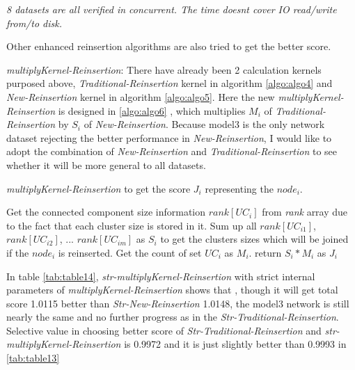 \documentclass{article}
\begin{document}
\begin{table}[!htbp]
\begin{adjustwidth}{-2cm}{}
\begin{threeparttable}
\begin{tabular}{|c|c|c|c|c|c|c|c|c|c|}
			\end{tabular}
			\begin{tablenotes}
				\small
				\item\textit{ 8 datasets are all verified in concurrent. The time doesn\textquotesingle t cover IO read/write from/to disk.}
			\end{tablenotes}			
		\end{threeparttable}
	\end{adjustwidth}	
	\end{table}
	 
	Other enhanced reinsertion algorithms are also tried to get the better score.
	 
	\begin{enumerate}
		
	\begin{item}
			
		\textit{multiplyKernel-Reinsertion}: There have already been 2 calculation kernels purposed above, \textit{Traditional-Reinsertion} kernel in algorithm \ref{algo:algo4} and \textit{New-Reinsertion} kernel in algorithm \ref{algo:algo5}. Here the new \textit{multiplyKernel-Reinsertion} is designed in \ref{algo:algo6} , which multiplies $M_i$ of \textit{Traditional-Reinsertion} by $S_i$ of \textit{New-Reinsertion}. Because model3 is the only network dataset rejecting the better performance in \textit{New-Reinsertion}, I would like to adopt the combination of \textit{New-Reinsertion} and \textit{Traditional-Reinsertion} to see whether it will be more general to all datasets.

		\begin{algorithm}[!htbp]
			\caption{ \textit{multiplyKernel-Reinsertion} to get the score $J_i$ representing the $node_i$. }
			\label{algo:algo6}
			\begin{algorithmic}[1]
				\State Get the connected component size information $rank[UC_{i}]$ from \textit{rank} array due to the fact that each cluster size is stored in it. Sum up all $rank[UC_{i1}]$, $rank[UC_{i2}]$, ... $rank[UC_{im}]$ as $S_i$ to get the clusters sizes which will be joined if the $node_i$ is reinserted.
				\State Get the count of set $UC_{i}$ as $M_i$.			
				\State return $S_i*M_i$ as $J_i$ 
			\end{algorithmic}
		\end{algorithm}	
		
		In table \ref{tab:table14}, \textit{str-multiplyKernel-Reinsertion} with strict internal parameters of \textit{multiplyKernel-Reinsertion} shows that , though it will get total score 1.0115 better than \textit{Str-New-Reinsertion} 1.0148, the model3 network is still nearly the same and no further progress as in the \textit{Str-Traditional-Reinsertion}. Selective value in choosing better score of \textit{Str-Traditional-Reinsertion} and \textit{str-multiplyKernel-Reinsertion} is 0.9972 and it is just slightly better than 0.9993 in \ref{tab:table13}


\end{item}
\end{enumerate}
\end{document}
